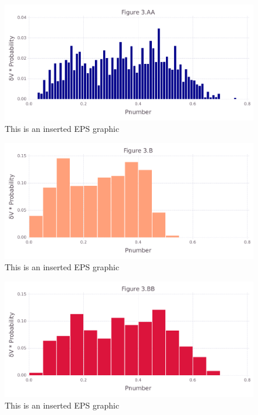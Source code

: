 \documentclass[10pt,letterpaper]{article}
\begin{document}
\begin{figure}[ht]
\begin{center}
\includegraphics[scale=0.5]{1prn/3aafigure.pdf}
\caption{This is an inserted EPS graphic}
\label{fig8}
\end{center}
\end{figure}

\begin{figure}[ht]
\begin{center}
\includegraphics[scale=0.5]{1prn/3bfigure.pdf}
\caption{This is an inserted EPS graphic}
\label{fig10}
\end{center}
\end{figure}

\begin{figure}[ht]
\begin{center}
\includegraphics[scale=0.5]{1prn/3bbfigure.pdf}
\caption{This is an inserted EPS graphic}
\label{fig11}
\end{center}
\end{figure}
\end{document}
